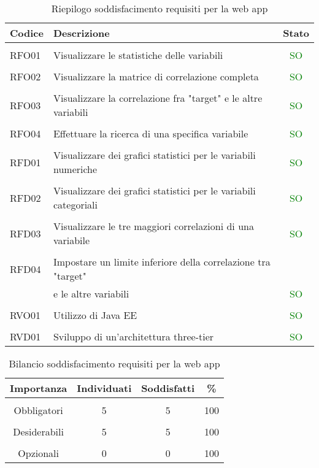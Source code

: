 \begin{table}[!h] %
	\caption{Riepilogo soddisfacimento requisiti per la web app}
	\label{tab:soddisfacimento-app}
	\centering
	\begin{tabular}{ l | l | c}
		\textbf{Codice} & \textbf{Descrizione} & \textbf{Stato}\\
		\hline
		\hline
		\\[-2.5mm]
		RFO01 & Visualizzare le statistiche delle variabili & \textcolor{green}{SO} \\
		\hline
		\\[-2.5mm]
		RFO02 & Visualizzare la matrice di correlazione completa & \textcolor{green}{SO} \\
		\hline
		\\[-2.5mm]
		RFO03 & Visualizzare la correlazione fra "target" e le altre variabili & \textcolor{green}{SO} \\
		\hline
		\\[-2.5mm]
		RFO04 & Effettuare la ricerca di una specifica variabile & \textcolor{green}{SO} \\
		\hline
		\hline
		\\[-2.5mm]
		RFD01 & Visualizzare dei grafici statistici per le variabili numeriche & \textcolor{green}{SO} \\
		\hline
		\\[-2.5mm]
		RFD02 & Visualizzare dei grafici statistici per le variabili categoriali & \textcolor{green}{SO} \\
		\hline
		\\[-2.5mm]
		RFD03 & Visualizzare le tre maggiori correlazioni di una variabile & \textcolor{green}{SO} \\
		\hline
		\\[-2.5mm]
		RFD04 & Impostare un limite inferiore della correlazione tra "target" \\ & e le altre variabili & \textcolor{green}{SO} \\
		\hline
		\hline
		\\[-2.5mm]
		RVO01 & Utilizzo di Java EE & \textcolor{green}{SO} \\
		\hline\hline
		\\[-2.5mm]
		RVD01 & Sviluppo di un'architettura three-tier & \textcolor{green}{SO} \\
		\hline
	\end{tabular}
\end{table}%

\begin{table}[!h] %
	\caption{Bilancio soddisfacimento requisiti per la web app}
	\label{tab:bilancio-app}
	\centering
	\begin{tabular}{ c | c | c | c}
		\textbf{Importanza} & \textbf{Individuati} & \textbf{Soddisfatti} & \textbf{\%}\\
		\hline
		\hline
		\\[-2.5mm]
		Obbligatori & 5 & 5 & 100 \\
		\hline
		\\[-2.5mm]
		Desiderabili & 5 & 5 & 100 \\
		\hline
		\\[-2.5mm]
		Opzionali & 0 & 0 & 100 \\
		\hline
	\end{tabular}
\end{table}%
